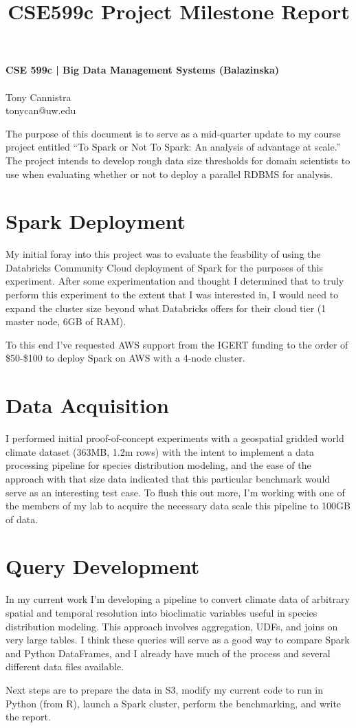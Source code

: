 \documentclass[11pt]{article}
\title{CSE599c Project Milestone Report}
\begin{document}
\makeatletter


\begin{center}
{\bf CSE 599c | Big Data Management Systems (Balazinska)\\
\@title\\}
Tony Cannistra\\
tonycan@uw.edu
\end{center}


The purpose of this document is to serve as a mid-quarter update to my course project entitled ``To Spark or Not To Spark: An analysis of advantage at scale.'' The project intends to develop rough data size thresholds for domain scientists to use when evaluating whether or not to deploy a parallel RDBMS for analysis.  
\section{Spark Deployment}
My initial foray into this project was to evaluate the feasbility of using the Databricks Community Cloud deployment of Spark for the purposes of this experiment. After some experimentation and thought I determined that to truly perform this experiment to the extent that I was interested in, I would need to expand the cluster size beyond what Databricks offers for their cloud tier (1 master node, 6GB of RAM). 

To this end I've requested AWS support from the IGERT funding to the order of \$50-\$100 to deploy Spark on AWS with a 4-node cluster. 

\section{Data Acquisition}
I performed initial proof-of-concept experiments with a geospatial gridded world climate dataset (363MB, 1.2m rows) with the intent to implement a data processing pipeline for species distribution modeling, and the ease of the approach with that size data indicated that this particular benchmark would serve as an interesting test case. To flush this out more, I'm working with one of the members of my lab to acquire the necessary data scale this pipeline to 100GB of data. 

\section{Query Development}
In my current work I'm developing a pipeline to convert climate data of arbitrary spatial and temporal resolution into bioclimatic variables useful in species distribution modeling. This approach involves aggregation, UDFs, and joins on very large tables. I think these queries will serve as a good way to compare Spark and Python DataFrames, and I already have much of the process and several different data files available. 

Next steps are to prepare the data in S3, modify my current code to run in Python (from R), launch a Spark cluster, perform the benchmarking, and write the report.





\end{document}
